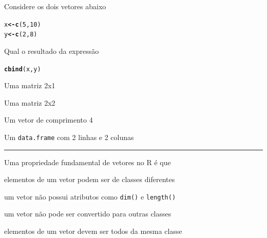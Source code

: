 \documentclass[a4paper,11pt,fleqn]{article}\usepackage[]{graphicx}\usepackage[]{color}
\makeatletter
\newcommand{\hlnum}[1]{\textcolor[rgb]{0,0,0}{#1}}%
\newcommand{\hlstd}[1]{\textcolor[rgb]{0,0,0}{#1}}%
\newcommand{\hlkwb}[1]{\textcolor[rgb]{0,0,0}{\textbf{#1}}}%
\newcommand{\hlkwd}[1]{\textcolor[rgb]{0,0,0}{\textbf{#1}}}%
\newenvironment{kframe}{%
 \def\at@end@of@kframe{}%
 \ifinner\ifhmode%
  \def\at@end@of@kframe{\end{minipage}}%
  \begin{minipage}{\columnwidth}%
 \fi\fi%
 \def\FrameCommand##1{\hskip\@totalleftmargin \hskip-\fboxsep
 \colorbox{shadecolor}{##1}\hskip-\fboxsep
     \hskip-\linewidth \hskip-\@totalleftmargin \hskip\columnwidth}%
 \MakeFramed {\advance\hsize-\width
   \@totalleftmargin\z@ \linewidth\hsize
   \@setminipage}}%
 {\par\unskip\endMakeFramed%
 \at@end@of@kframe}
\newenvironment{knitrout}{}{} %
\theoremstyle{definition}
\makeatother
\begin{document}
\begin{compactenum}[6.]
\item Considere os dois vetores abaixo
\begin{knitrout}\small
{}\color{fgcolor}\begin{kframe}
\begin{alltt}
\hlstd{x} \hlkwb{<-} \hlkwd{c}\hlstd{(}\hlnum{5}\hlstd{,} \hlnum{10}\hlstd{)}
\hlstd{y} \hlkwb{<-} \hlkwd{c}\hlstd{(}\hlnum{2}\hlstd{,} \hlnum{8}\hlstd{)}
\end{alltt}
\end{kframe}
\end{knitrout}
Qual o resultado da expressão
\begin{knitrout}\small
{}\color{fgcolor}\begin{kframe}
\begin{alltt}
\hlkwd{cbind}\hlstd{(x, y)}
\end{alltt}
\end{kframe}
\end{knitrout}
\begin{compactenum}
  \item Uma matriz 2x1
  \item Uma matriz 2x2
  \item Um vetor de comprimento 4
  \item Um \texttt{data.frame} com 2 linhas e 2 colunas
\end{compactenum}

\end{compactenum}

\vspace{0.3cm}
\hrule
\vspace{0.3cm}

\begin{compactenum}[7.]
\item Uma propriedade fundamental de vetores no R é que
\begin{compactenum}
  \item elementos de um vetor podem ser de classes diferentes
  \item um vetor não possui atributos como \texttt{dim()} e
    \texttt{length()}
  \item um vetor não pode ser convertido para outras classes
  \item elementos de um vetor devem ser todos da mesma classe
\end{compactenum}
\end{compactenum}
\end{document}
